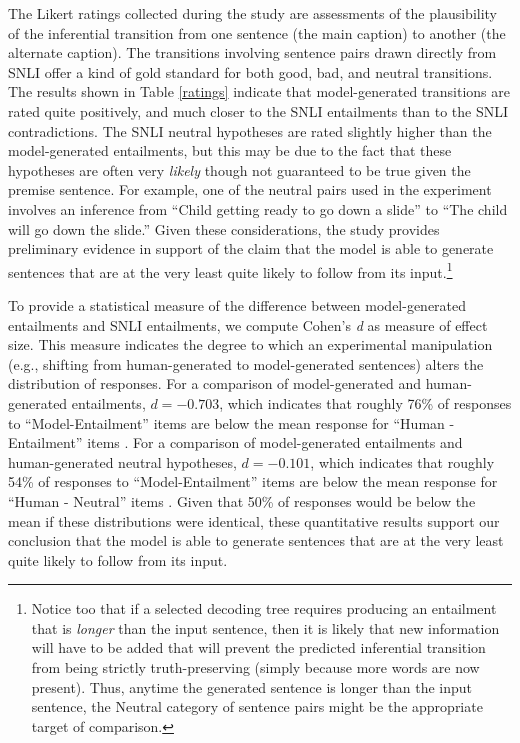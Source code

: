 \documentclass[utf8]{frontiersSCNS} %
\begin{document}
The Likert ratings collected during the study are assessments of the plausibility of the inferential transition from one sentence (the main caption) to another (the alternate caption). The transitions involving sentence pairs drawn directly from SNLI offer a kind of gold standard for both good, bad, and neutral transitions. The results shown in Table \ref{ratings} indicate that model-generated transitions are rated quite positively, and much closer to the SNLI entailments than to the SNLI contradictions. The SNLI neutral hypotheses are rated slightly higher than the model-generated entailments, but this may be due to the fact that these hypotheses are often very \textit{likely} though not guaranteed to be true given the premise sentence. For example, one of the neutral pairs used in the experiment involves an inference from ``Child getting ready to go down a slide'' to ``The child will go down the slide.'' Given these considerations, the study provides preliminary evidence in support of the claim that the model is able to generate sentences that are at the very least quite likely to follow from its input.\footnote{Notice too that if a selected decoding tree requires producing an entailment that is \textit{longer} than the input sentence, then it is likely that new information will have to be added that will prevent the predicted inferential transition from being strictly truth-preserving (simply because more words are now present). Thus, anytime the generated sentence is longer than the input sentence, the Neutral category of sentence pairs might be the appropriate target of comparison.} 

To provide a statistical measure of the difference between model-generated entailments and SNLI entailments, we compute Cohen's \textit{d} as measure of effect size. This measure indicates the degree to which an experimental manipulation (e.g., shifting from human-generated to model-generated sentences) alters the distribution of responses. For a comparison of model-generated and human-generated entailments, $d = -0.703$, which indicates that roughly 76\% of responses to ``Model-Entailment'' items are below the mean response for ``Human - Entailment'' items \citep{Becker:2000}. For a comparison of model-generated entailments and human-generated neutral hypotheses, $d = -0.101$, which indicates that roughly 54\% of responses to ``Model-Entailment'' items are below the mean response for ``Human - Neutral'' items \citep{Becker:2000}. Given that 50\% of responses would be below the mean if these distributions were identical, these quantitative results support our conclusion that the model is able to generate sentences that are at the very least quite likely to follow from its input.
\end{document}
